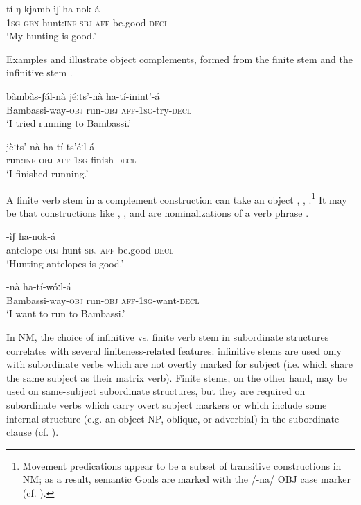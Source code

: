 \documentclass[output=paper]{langsci/langscibook}
\begin{document}
\ea\label{ex:mahland:35}
\gll tí-ŋ         kjamb-ìʃ         ha-nok-á  \\
\textsc{1sg-gen}    hunt:\textsc{inf-sbj}  \textsc{aff}{}-be.good-\textsc{decl} \\
\glt `My hunting is good.'
\z

Examples  and  illustrate object complements, formed from the finite stem  and the infinitive stem . 

\ea\label{ex:mahland:36}
\gll bàmbàs-ʃál-nà            jéːts'-nà    ha-tí-inint'-{\downstep}á\\
Bambassi-way-\textsc{obj}    run\textsc{{}-obj}     \textsc{aff-1sg}{}-try\textsc{{}-decl} \\
\glt `I tried running to Bambassi.'
\z

\ea\label{ex:mahland:37}
\gll jèːts'-nà        ha-tí-ts'éːl-{\downstep}á\\
run:\textsc{inf-obj}   \textsc{aff-1sg}{}-finish-\textsc{decl} \\
\glt `I finished running.'
\z

A finite verb stem in a complement construction can take an object , , .\footnote{Movement predications appear to be a subset of transitive constructions in NM; as a result, semantic Goals are marked with the /-na/ OBJ case marker (cf. \citealt[335-339]{Ahland2012}).} It may be that constructions like , , and  are nominalizations of a verb phrase \citep[625]{Ahland2012}.

\ea\label{ex:mahland:38}
-ìʃ     ha-nok-á \\
antelope\textsc{{}-obj}    hunt\textsc{{}-sbj}       \textsc{aff}-be.good\textsc{{}-decl} \\
\glt `Hunting antelopes is good.'
\z

\ea\label{ex:mahland:39}
-nà    ha-tí-wóːl-{\downstep}á\\
{\db}Bambassi-way\textsc{{}-obj}     run\textsc{{}-obj}      \textsc{aff-1sg}{}-want\textsc{{}-decl} \\
\glt `I want to run to Bambassi.'
\z

In NM, the choice of infinitive vs. finite verb stem in subordinate structures correlates with several finiteness-related features: infinitive stems are used only with subordinate verbs which are not overtly marked for subject (i.e. which share the same subject as their matrix verb). Finite stems, on the other hand, may be used on same-subject subordinate structures, but they are required on subordinate verbs which carry overt subject markers or which include some internal structure (e.g. an object NP, oblique, or adverbial) in the subordinate clause (cf. \citealt[612, 630]{Ahland2012M}). 
\end{document}
